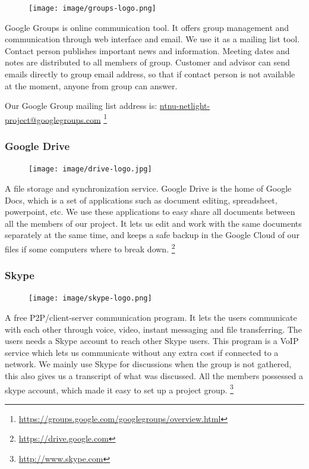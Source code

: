 \begin{figure}
\vspace{-30pt}
\centering
\texttt{[image: image/groups-logo.png]}
\end{figure}

Google Groups is online communication tool. It offers group management and communication through web interface and email. We use it as a mailing list tool. Contact person publishes important news and information. Meeting dates and notes are distributed to all members of group. Customer and advisor can send emails directly to group email address, so that if contact person is not available at the moment, anyone from group can answer.

Our Google Group mailing list address is:
\url{ntnu-netlight-project@googlegroups.com}
\footnote{\url{https://groups.google.com/googlegroups/overview.html}}

\subsubsection{Google Drive}

\begin{figure}
\vspace{-30pt}
\centering
\texttt{[image: image/drive-logo.jpg]}
\end{figure}

A file storage and synchronization service. Google Drive is the home of Google Docs, which is a set of applications such as document editing, spreadsheet, powerpoint, etc. We use these applications to easy share all documents between all the members of our project. It lets us edit and work with the same documents separately at the same time, and keeps a safe backup in the Google Cloud of our files if some computers where to break down.
\footnote{\url{https://drive.google.com}}


\subsubsection{Skype}

\begin{figure}
\vspace{-30pt}
\centering
\texttt{[image: image/skype-logo.png]}
\end{figure}

A free P2P/client-server communication program. It lets the users communicate with each other through voice, video, instant messaging and file transferring. The users needs a Skype account to reach other Skype users. This program is a VoIP service which lets us communicate without any extra cost if connected to a network. We mainly use Skype for discussions when the group is not gathered, this also gives us a transcript of what was discussed. All the members possessed a skype account, which made it easy to set up a project group.
\footnote{\url{http://www.skype.com}}

